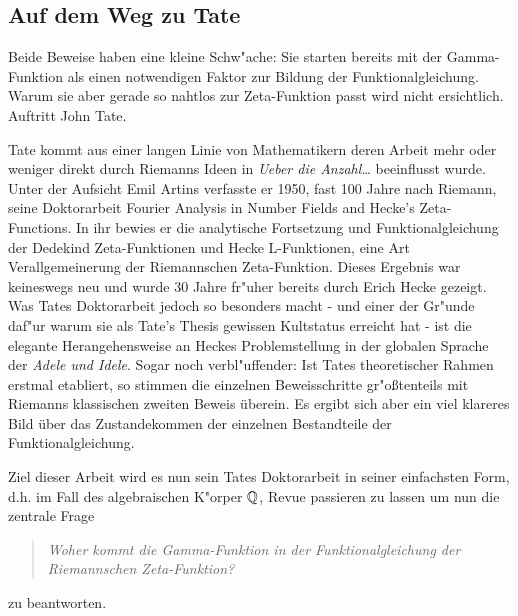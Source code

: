\subsection{Auf dem Weg zu Tate}
	Beide Beweise haben eine kleine Schw"ache: Sie starten bereits mit der Gamma-Funktion als einen notwendigen Faktor zur Bildung der Funktionalgleichung.
	Warum sie aber gerade so nahtlos zur Zeta-Funktion passt wird nicht ersichtlich. 
	Auftritt John Tate.
	
	Tate kommt aus einer langen Linie von Mathematikern deren Arbeit mehr oder weniger direkt durch Riemanns Ideen in  \emph{Ueber die Anzahl\dots} beeinflusst wurde.
	Unter der Aufsicht Emil Artins verfasste er 1950, fast 100 Jahre nach Riemann, seine Doktorarbeit \glqq Fourier Analysis in Number Fields and Hecke's Zeta-Functions\grqq{}\cite{tate}.
	In ihr bewies er die analytische Fortsetzung und Funktionalgleichung der Dedekind Zeta-Funktionen und Hecke L-Funktionen, eine Art Verallgemeinerung der Riemannschen Zeta-Funktion.
	Dieses Ergebnis war keineswegs neu und wurde 30 Jahre fr"uher bereits durch Erich Hecke gezeigt.
	Was Tates Doktorarbeit jedoch so besonders macht - und einer der Gr"unde daf"ur warum sie als  \glqq Tate's Thesis\grqq{} gewissen Kultstatus erreicht hat - ist die elegante Herangehensweise an Heckes Problemstellung in der globalen Sprache der \emph{Adele und Idele}.
	Sogar noch verbl"uffender: Ist Tates theoretischer Rahmen erstmal etabliert, so stimmen die einzelnen Beweisschritte gr"oßtenteils mit Riemanns klassischen zweiten Beweis überein.
	Es ergibt sich aber ein viel klareres Bild über das Zustandekommen der einzelnen Bestandteile der Funktionalgleichung.
	
	Ziel dieser Arbeit wird es nun sein Tates Doktorarbeit in seiner einfachsten Form, d.h. im Fall des algebraischen K"orper $\mathbb{Q}$, Revue passieren zu lassen um nun die zentrale Frage
	\begin{quote}
		\centering
		\textit{Woher kommt die Gamma-Funktion in der Funktionalgleichung der Riemannschen Zeta-Funktion?}
	\end{quote}
	zu beantworten. 
	
